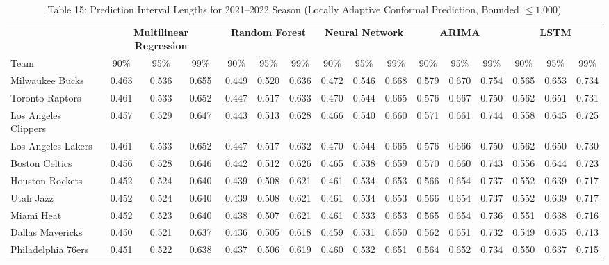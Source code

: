 \documentclass[11pt,a4paper]{article}
\begin{document}
\begin{table}[H]
\centering
\caption{Table 15: Prediction Interval Lengths for 2021--2022 Season (Locally Adaptive Conformal Prediction, Bounded $\le 1.000$)}
\label{tab:team_table15}
\tiny
\setlength{\tabcolsep}{1.5pt}
\begin{tabular}{l ccc ccc ccc ccc ccc}
\toprule
 & \multicolumn{3}{c}{\textbf{Multilinear Regression}} & \multicolumn{3}{c}{\textbf{Random Forest}} & \multicolumn{3}{c}{\textbf{Neural Network}} & \multicolumn{3}{c}{\textbf{ARIMA}} & \multicolumn{3}{c}{\textbf{LSTM}} \\
\cmidrule(lr){2-4} \cmidrule(lr){5-7} \cmidrule(lr){8-10} \cmidrule(lr){11-13} \cmidrule(lr){14-16}
Team & 90\% & 95\% & 99\% & 90\% & 95\% & 99\% & 90\% & 95\% & 99\% & 90\% & 95\% & 99\% & 90\% & 95\% & 99\% \\
\midrule
Milwaukee Bucks & 0.463 & 0.536 & 0.655 & 0.449 & 0.520 & 0.636 & 0.472 & 0.546 & 0.668 & 0.579 & 0.670 & 0.754 & 0.565 & 0.653 & 0.734 \\
Toronto Raptors & 0.461 & 0.533 & 0.652 & 0.447 & 0.517 & 0.633 & 0.470 & 0.544 & 0.665 & 0.576 & 0.667 & 0.750 & 0.562 & 0.651 & 0.731 \\
Los Angeles Clippers & 0.457 & 0.529 & 0.647 & 0.443 & 0.513 & 0.628 & 0.466 & 0.540 & 0.660 & 0.571 & 0.661 & 0.744 & 0.558 & 0.645 & 0.725 \\
Los Angeles Lakers & 0.461 & 0.533 & 0.652 & 0.447 & 0.517 & 0.632 & 0.470 & 0.544 & 0.665 & 0.576 & 0.666 & 0.750 & 0.562 & 0.650 & 0.730 \\
Boston Celtics & 0.456 & 0.528 & 0.646 & 0.442 & 0.512 & 0.626 & 0.465 & 0.538 & 0.659 & 0.570 & 0.660 & 0.743 & 0.556 & 0.644 & 0.723 \\
Houston Rockets & 0.452 & 0.524 & 0.640 & 0.439 & 0.508 & 0.621 & 0.461 & 0.534 & 0.653 & 0.566 & 0.654 & 0.737 & 0.552 & 0.639 & 0.717 \\
Utah Jazz & 0.452 & 0.524 & 0.640 & 0.439 & 0.508 & 0.621 & 0.461 & 0.534 & 0.653 & 0.566 & 0.654 & 0.737 & 0.552 & 0.639 & 0.717 \\
Miami Heat & 0.452 & 0.523 & 0.640 & 0.438 & 0.507 & 0.621 & 0.461 & 0.533 & 0.653 & 0.565 & 0.654 & 0.736 & 0.551 & 0.638 & 0.716 \\
Dallas Mavericks & 0.450 & 0.521 & 0.637 & 0.436 & 0.505 & 0.618 & 0.459 & 0.531 & 0.650 & 0.562 & 0.651 & 0.732 & 0.549 & 0.635 & 0.713 \\
Philadelphia 76ers & 0.451 & 0.522 & 0.638 & 0.437 & 0.506 & 0.619 & 0.460 & 0.532 & 0.651 & 0.564 & 0.652 & 0.734 & 0.550 & 0.637 & 0.715 \\

\end{tabular}
\end{table}
\end{document}
